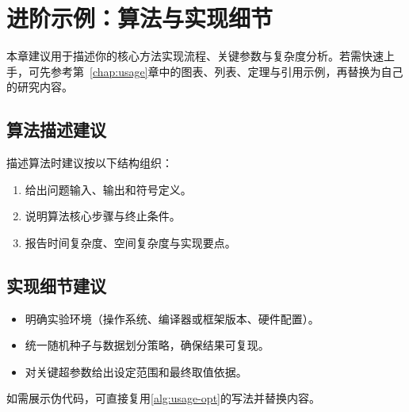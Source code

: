 \chapter{进阶示例：算法与实现细节}

本章建议用于描述你的核心方法实现流程、关键参数与复杂度分析。若需快速上手，可先参考第~\ref{chap:usage}章中的图表、列表、定理与引用示例，再替换为自己的研究内容。

\section{算法描述建议}

描述算法时建议按以下结构组织：
\begin{enumerate}
  \item 给出问题输入、输出和符号定义。
  \item 说明算法核心步骤与终止条件。
  \item 报告时间复杂度、空间复杂度与实现要点。
\end{enumerate}

\section{实现细节建议}

\begin{itemize}
  \item 明确实验环境（操作系统、编译器或框架版本、硬件配置）。
  \item 统一随机种子与数据划分策略，确保结果可复现。
  \item 对关键超参数给出设定范围和最终取值依据。
\end{itemize}

如需展示伪代码，可直接复用\cref{alg:usage-opt}的写法并替换内容。
